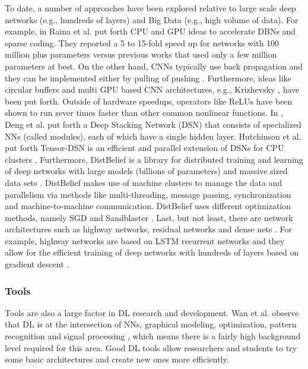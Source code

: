 \documentclass[12pt]{spieman}
\begin{document}
\begin{spacing}{1}
To date, a number of approaches have been explored relative to large scale deep networks (e.g., hundreds of layers) and Big Data (e.g., high volume of data). For example, in \cite{Raina:2009:LDU:1553374.1553486} Raina et al. put forth CPU and GPU ideas to accelerate DBNs and sparse coding. They reported a 5 to 15-fold speed up for networks with 100 million plus parameters versus previous works that used only a few million parameters at best. On the other hand, CNNs typically use back propagation and they can be implemented either by pulling of pushing \cite{Ciresan:2011:FHP:2283516.2283603} . Furthermore, ideas like circular buffers \cite{Scherer:2010:EPO:1886436.1886447} and multi GPU based CNN architectures, e.g., Krizhevsky \cite{krizhevsky2012imagenet} , have been put forth. Outside of hardware speedups, operators like ReLUs have been shown to run sever times faster than other common nonlinear functions. In \cite{6288333} , Deng et al. put forth a Deep Stacking Network (DSN) that consists of specialized NNs (called modules), each of which have a single hidden layer. Hutchinson et al. put forth Tensor-DSN is an efficient and parallel extension of DSNs for CPU clusters \cite{Hutchinson:2013:TDS:2498740.2498878} . Furthermore, DistBelief is a library for distributed training and learning of deep networks with large models (billions of parameters) and massive sized data sets \cite{Dean:2012:LSD:2999134.2999271} . DistBelief makes use of machine clusters to manage the data and parallelism via methods like multi-threading, message passing, synchronization and machine-to-machine communication. DistBelief uses different optimization methods, namely SGD and Sandblaster \cite{dean2012large} . Last, but not least, there are network architectures such as highway networks, residual networks and dense nets  \cite{DBLP:journals/corr/HeZRS15,DBLP:journals/corr/SrivastavaGS15,DBLP:journals/corr/GreffSS16,DBLP:journals/corr/ZillySKS16,DBLP:journals/corr/SrivastavaGS15a} . For example, highway networks are based on LSTM recurrent networks and they allow for the efficient training of deep networks with hundreds of layers based on gradient descent  \cite{DBLP:journals/corr/SrivastavaGS15,DBLP:journals/corr/GreffSS16,DBLP:journals/corr/ZillySKS16} .

\subsubsection{Tools}
\label{subsubsec:Tools}
Tools are also a large factor in DL research and development. Wan et al. observe that DL is at the intersection of NNs, graphical modeling, optimization, pattern recognition and signal processing \cite{Wan2014Deep} , which means there is a fairly high background level required for this area. Good DL tools allow researchers and students to try some basic architectures and create new ones more efficiently. 


\end{spacing}
\end{document}
